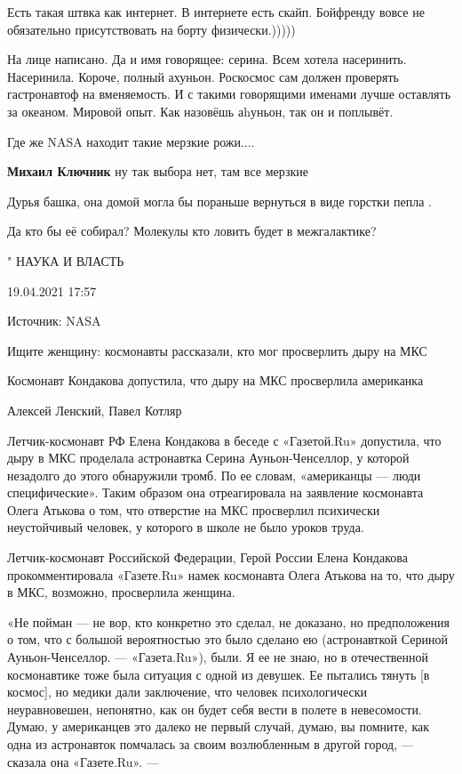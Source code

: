\begin{itemize}
\begin{itemize} %
Есть такая штвка как интернет. В интернете есть скайп. Бойфренду вовсе не обязательно присутствовать на борту физически.)))))
\end{itemize} %

На лице написано. Да и имя говорящее: серина. Всем хотела насеринить. Насеринила.
Короче, полный ахуньон.
Роскосмос сам должен проверять гастронавтоф на вменяемость. И с такими говорящими именами лучше оставлять за океаном. Мировой опыт. Как назовёшь аhуньон, так он и поплывёт.

Где же NASA находит такие мерзкие рожи....

\textbf{Михаил Ключник} ну так выбора нет, там все мерзкие

Дурья башка, она домой могла бы пораньше вернуться в виде горстки пепла .

Да кто бы её собирал? Молекулы кто ловить будет в межгалактике?



" НАУКА И ВЛАСТЬ

19.04.2021 17:57

Источник: NASA

Ищите женщину: космонавты рассказали, кто мог просверлить дыру на МКС

Космонавт Кондакова допустила, что дыру на МКС просверлила американка

Алексей Ленский, Павел Котляр

Летчик-космонавт РФ Елена Кондакова в беседе с «Газетой.Ru» допустила, что дыру
в МКС проделала астронавтка Серина Ауньон-Ченселлор, у которой незадолго до
этого обнаружили тромб. По ее словам, «американцы — люди специфические». Таким
образом она отреагировала на заявление космонавта Олега Атькова о том, что
отверстие на МКС просверлил психически неустойчивый человек, у которого в школе
не было уроков труда.

Летчик-космонавт Российской Федерации, Герой России Елена Кондакова
прокомментировала «Газете.Ru» намек космонавта Олега Атькова на то, что дыру в
МКС, возможно, просверлила женщина.

«Не пойман — не вор, кто конкретно это сделал, не доказано, но предположения о
том, что с большой вероятностью это было сделано ею (астронавткой Сериной
Ауньон-Ченселлор. — «Газета.Ru»), были. Я ее не знаю, но в отечественной
космонавтике тоже была ситуация с одной из девушек. Ее пытались тянуть [в
космос], но медики дали заключение, что человек психологически неуравновешен,
непонятно, как он будет себя вести в полете в невесомости. Думаю, у американцев
это далеко не первый случай, думаю, вы помните, как одна из астронавток
помчалась за своим возлюбленным в другой город, — сказала она «Газете.Ru». —


\end{itemize}
